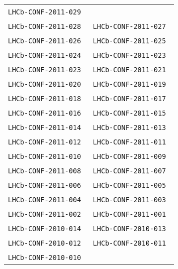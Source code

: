 \begin{center}
\begin{longtable}{ll}
\texttt{LHCb-CONF-2011-029}~\cite{LHCb-CONF-2011-029} \\
\texttt{LHCb-CONF-2011-028}~\cite{LHCb-CONF-2011-028} &
\texttt{LHCb-CONF-2011-027}~\cite{LHCb-CONF-2011-027} \\
\texttt{LHCb-CONF-2011-026}~\cite{LHCb-CONF-2011-026} &
\texttt{LHCb-CONF-2011-025}~\cite{LHCb-CONF-2011-025} \\
\texttt{LHCb-CONF-2011-024}~\cite{LHCb-CONF-2011-024} &
\texttt{LHCb-CONF-2011-023}~\cite{LHCb-CONF-2011-023} \\
\texttt{LHCb-CONF-2011-023}~\cite{LHCb-CONF-2011-022} &
\texttt{LHCb-CONF-2011-021}~\cite{LHCb-CONF-2011-021} \\
\texttt{LHCb-CONF-2011-020}~\cite{LHCb-CONF-2011-020} &
\texttt{LHCb-CONF-2011-019}~\cite{LHCb-CONF-2011-019} \\
\texttt{LHCb-CONF-2011-018}~\cite{LHCb-CONF-2011-018} &
\texttt{LHCb-CONF-2011-017}~\cite{LHCb-CONF-2011-017} \\
\texttt{LHCb-CONF-2011-016}~\cite{LHCb-CONF-2011-016} &
\texttt{LHCb-CONF-2011-015}~\cite{LHCb-CONF-2011-015} \\
\texttt{LHCb-CONF-2011-014}~\cite{LHCb-CONF-2011-014} &
\texttt{LHCb-CONF-2011-013}~\cite{LHCb-CONF-2011-013} \\
\texttt{LHCb-CONF-2011-012}~\cite{LHCb-CONF-2011-012} &
\texttt{LHCb-CONF-2011-011}~\cite{LHCb-CONF-2011-011} \\
\texttt{LHCb-CONF-2011-010}~\cite{LHCb-CONF-2011-010} &
\texttt{LHCb-CONF-2011-009}~\cite{LHCb-CONF-2011-009} \\
\texttt{LHCb-CONF-2011-008}~\cite{LHCb-CONF-2011-008} &
\texttt{LHCb-CONF-2011-007}~\cite{LHCb-CONF-2011-007} \\
\texttt{LHCb-CONF-2011-006}~\cite{LHCb-CONF-2011-006} &
\texttt{LHCb-CONF-2011-005}~\cite{LHCb-CONF-2011-005} \\
\texttt{LHCb-CONF-2011-004}~\cite{LHCb-CONF-2011-004} &
\texttt{LHCb-CONF-2011-003}~\cite{LHCb-CONF-2011-003} \\
\texttt{LHCb-CONF-2011-002}~\cite{LHCb-CONF-2011-002} &
\texttt{LHCb-CONF-2011-001}~\cite{LHCb-CONF-2011-001} \\
\hline
\texttt{LHCb-CONF-2010-014}~\cite{LHCb-CONF-2010-014} &
\texttt{LHCb-CONF-2010-013}~\cite{LHCb-CONF-2010-013} \\
\texttt{LHCb-CONF-2010-012}~\cite{LHCb-CONF-2010-012} &
\texttt{LHCb-CONF-2010-011}~\cite{LHCb-CONF-2010-011} \\
\texttt{LHCb-CONF-2010-010}~\cite{LHCb-CONF-2010-010} &

\end{longtable}
\end{center}
